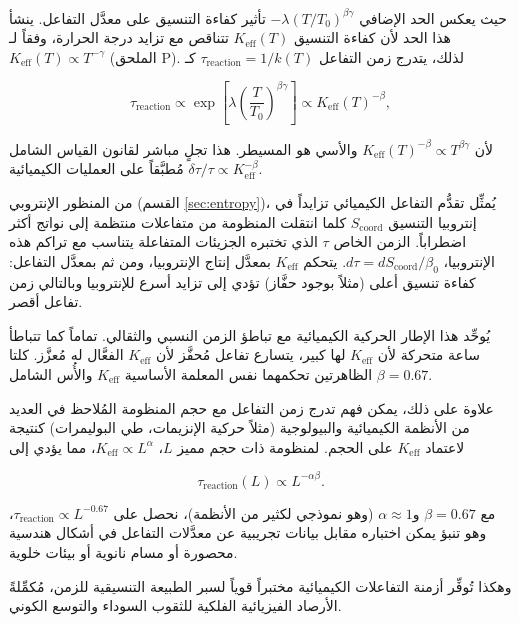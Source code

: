 \documentclass[11pt,a4paper]{article}
\newcommand{\Ke}{K_{\mathrm{eff}}}
\newcommand{\Scoord}{S_{\mathrm{coord}}}
\begin{document}
	حيث يعكس الحد الإضافي \(-\lambda (T/T_0)^{\beta\gamma}\) تأثير كفاءة التنسيق على معدَّل التفاعل. ينشأ هذا الحد لأن كفاءة التنسيق \(\Ke(T)\) تتناقص مع تزايد درجة الحرارة، وفقاً لـ \(\Ke(T) \propto T^{-\gamma}\) (الملحق P). لذلك، يتدرج زمن التفاعل \(\tau_{\mathrm{reaction}} = 1/k(T)\) كـ
	
	\begin{equation}
		\tau_{\mathrm{reaction}} \propto \exp\left[\lambda \left(\frac{T}{T_0}\right)^{\beta\gamma}\right] \propto \Ke(T)^{-\beta},
	\end{equation}
	
	لأن \(\Ke(T)^{-\beta} \propto T^{\beta\gamma}\) والأسي هو المسيطر. هذا تجلٍ مباشر لقانون القياس الشامل \(\delta \tau / \tau \propto \Ke^{-\beta}\) مُطبَّقاً على العمليات الكيميائية.
	
	من المنظور الإنتروبي (القسم \ref{sec:entropy})، يُمثِّل تقدُّم التفاعل الكيميائي تزايداً في إنتروبيا التنسيق \(\Scoord\) كلما انتقلت المنظومة من متفاعلات منتظمة إلى نواتج أكثر اضطراباً. الزمن الخاص \(\tau\) الذي تختبره الجزيئات المتفاعلة يتناسب مع تراكم هذه الإنتروبيا، \(d\tau = d\Scoord / \beta_0\). يتحكم \(\Ke\) بمعدَّل إنتاج الإنتروبيا، ومن ثم بمعدَّل التفاعل: كفاءة تنسيق أعلى (مثلاً بوجود حفَّاز) تؤدي إلى تزايد أسرع للإنتروبيا وبالتالي زمن تفاعل أقصر.
	
	يُوحِّد هذا الإطار الحركية الكيميائية مع تباطؤ الزمن النسبي والثقالي. تماماً كما تتباطأ ساعة متحركة لأن \(\Ke\) لها كبير، يتسارع تفاعل مُحفَّز لأن \(\Ke\) الفعَّال له مُعزَّز. كلتا الظاهرتين تحكمهما نفس المعلمة الأساسية \(\Ke\) والأُس الشامل \(\beta = 0.67\).
	
	علاوة على ذلك، يمكن فهم تدرج زمن التفاعل مع حجم المنظومة المُلاحظ في العديد من الأنظمة الكيميائية والبيولوجية (مثلاً حركية الإنزيمات، طي البوليمرات) كنتيجة لاعتماد \(\Ke\) على الحجم. لمنظومة ذات حجم مميز \(L\)، \(\Ke \propto L^{\alpha}\)، مما يؤدي إلى
	
	\begin{equation}
		\tau_{\mathrm{reaction}}(L) \propto L^{-\alpha\beta}.
	\end{equation}
	
	مع \(\beta = 0.67\) و\(\alpha \approx 1\) (وهو نموذجي لكثير من الأنظمة)، نحصل على \(\tau_{\mathrm{reaction}} \propto L^{-0.67}\)، وهو تنبؤ يمكن اختباره مقابل بيانات تجريبية عن معدَّلات التفاعل في أشكال هندسية محصورة أو مسام نانوية أو بيئات خلوية.
	
	وهكذا تُوفِّر أزمنة التفاعلات الكيميائية مختبراً قوياً لسبر الطبيعة التنسيقية للزمن، مُكمِّلةً الأرصاد الفيزيائية الفلكية للثقوب السوداء والتوسع الكوني.
	
\end{document}
